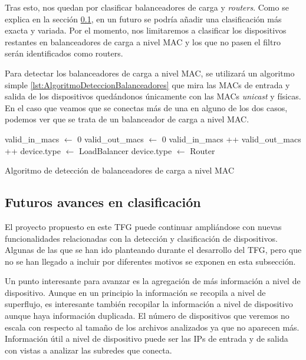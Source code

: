 \documentclass[twoside, 12pt]{epstfg}
\begin{document}
Tras esto, nos quedan por clasificar balanceadores de carga y \textit{routers}. Como se explica en la sección \ref{subsec:Analisis:Dispositivos:Futuro}, en un futuro se podría añadir una clasificación más exacta y variada. Por el momento, nos limitaremos a clasificar los dispositivos restantes en balanceadores de carga a nivel MAC y los que no pasen el filtro serán identificados como routers.

Para detectar los balanceadores de carga a nivel MAC, se utilizará un algoritmo simple \ref{lst:AlgoritmoDeteccionBalanceadores} que mira las MACs de entrada y salida de los dispositivos quedándonos únicamente con las MACs \textit{unicast} y físicas. En el caso que veamos que se conectas más de una en alguno de los dos casos, podemos ver que se trata de un balanceador de carga a nivel MAC.

\begin{algorithm}[btp]
\begin{algorithmic}
\State valid\_in\_macs $\gets$ 0
\State valid\_out\_macs $\gets$ 0
            \State valid\_in\_macs ++
        \EndIf
    \EndFor
            \State valid\_out\_macs ++
        \EndIf
    \EndFor
        \State device.type $\gets$ LoadBalancer
    \Else
        \State device.type $\gets$ Router
    \EndIf
\EndFor
\EndFunction
\end{algorithmic}
\caption{Algoritmo de detección de balanceadores de carga a nivel MAC}
\label{lst:AlgoritmoDeteccionBalanceadores}
\end{algorithm}

\subsection{Futuros avances en clasificación}
\label{subsec:Analisis:Dispositivos:Futuro}
El proyecto propuesto en este TFG puede continuar ampliándose con nuevas funcionalidades relacionadas con la detección y clasificación de dispositivos. Algunas de las que se han ido planteando durante el desarrollo del TFG, pero que no se han llegado a incluir por diferentes motivos se exponen en esta subsección.

Un punto interesante para avanzar es la agregación de más información a nivel de dispositivo. Aunque en un principio la información se recopila a nivel de superflujo, es interesante también recopilar la información a nivel de dispositivo aunque haya información duplicada. El número de dispositivos que veremos no escala con respecto al tamaño de los archivos analizados ya que no aparecen más. Información útil a nivel de dispositivo puede ser las IPs de entrada y de salida con vistas a analizar las subredes que conecta.
\end{document}
